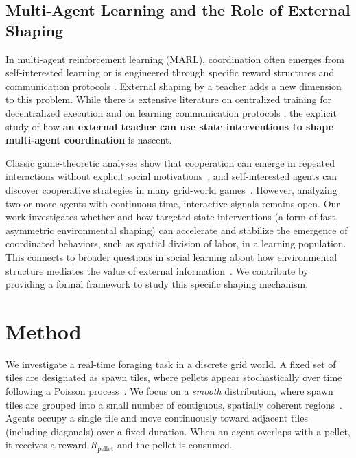 \documentclass[10pt,letterpaper]{article}
\begin{document}
\subsection{Multi-Agent Learning and the Role of External Shaping}

In multi-agent reinforcement learning (MARL), coordination often emerges from self-interested learning \cite{axelrod1984cooperation, austerweil2015impact} or is engineered through specific reward structures \cite{wolpert2001optimal} and communication protocols \cite{foerster2016learning}. External shaping by a teacher adds a new dimension to this problem. While there is extensive literature on centralized training for decentralized execution \cite{lowe2017multi, rashid2020monotonic, foerster2018counterfactual} and on learning communication protocols \cite{foerster2016learning}, the explicit study of how \textbf{an external teacher can use state interventions to shape multi-agent coordination} is nascent.

Classic game-theoretic analyses show that cooperation can emerge in repeated interactions without explicit social motivations~\cite{axelrod1984cooperation}, and self-interested agents can discover cooperative strategies in many grid-world games~\cite{austerweil2015impact}. However, analyzing two or more agents with continuous-time, interactive signals remains open. Our work investigates whether and how targeted state interventions (a form of fast, asymmetric environmental shaping) can accelerate and stabilize the emergence of coordinated behaviors, such as spatial division of labor, in a learning population. This connects to broader questions in social learning about how environmental structure mediates the value of external information~\cite{wu2025adaptive}. We contribute by providing a formal framework to study this specific shaping mechanism.

\section{Method}

We investigate a real-time foraging task in a discrete grid world. A fixed set of tiles are designated as spawn tiles, where pellets appear stochastically over time following a Poisson process~\cite{kingman1992}. We focus on a \emph{smooth} distribution, where spawn tiles are grouped into a small number of contiguous, spatially coherent regions~\cite{wu2025adaptive}. Agents occupy a single tile and move continuously toward adjacent tiles (including diagonals) over a fixed duration. When an agent overlaps with a pellet, it receives a reward $R_{\text{pellet}}$ and the pellet is consumed.
\end{document}
